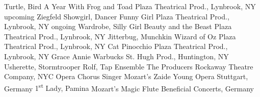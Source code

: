 \begin{cventries}
  \cventrytabb %
    {Turtle, Bird}%
    {A Year With Frog and Toad}%
    {Plaza Theatrical Prod., Lynbrook, NY}%
    {upcoming} %
  \cventrytabb %
    {Ziegfeld Showgirl, Dancer}%
    {Funny Girl}%
    {Plaza Theatrical Prod., Lynbrook, NY}%
    {ongoing} %
  \cventrytab %
    {Wardrobe, Silly Girl}%
    {Beauty and the Beast}%
    {Plaza Theatrical Prod., Lynbrook, NY}%
    {} %
  \cventrytab %
    {Jitterbug, Munchkin}%
    {Wizard of Oz}%
    {Plaza Theatrical Prod., Lynbrook, NY}%
    {} %
  \cventrytab %
    {Cat}%
    {Pinocchio}%
    {Plaza Theatrical Prod., Lynbrook, NY}%
    {} %
  \cventrytab %
    {Grace}%
    {Annie Warbucks}%
    {St. Hugh Prod., Huntington, NY}%
    {} %
  \cventrytab 
    {Usherette, Stormtrooper Rolf, Tap Ensemble}%
    {The Producers}%
    {Rockaway Theatre Company, NYC}%
    {} %
  \cventrytab
    {Opera Chorus Singer}%
    {Mozart's Zaide}%
    {Young Opera Stuttgart, Germany}%
    {}
  \cventrytab
    {1\textsuperscript{st} Lady, Pamina}
    {Mozart's Magic Flute}
    {Beneficial Concerts, Germany}
    {}
\end{cventries}